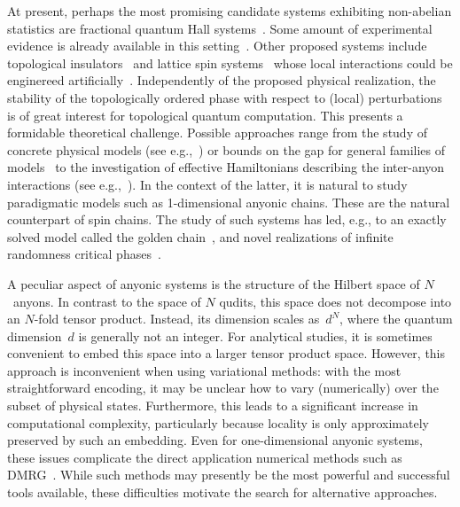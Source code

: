\documentclass[floats,prb,twocolumn]{revtex4}
\begin{document}
At present, perhaps the most promising candidate systems exhibiting non-abelian statistics are fractional quantum Hall systems~\cite{MooreRead,readrezayia,readrezayib}. Some amount of experimental evidence is already available in this setting~\cite{dolevetal,raduetal,willettetal}. Other proposed systems include topological insulators~\cite{FuKane05,MooreBalents07,LiangKaneMele07,Roy09} and lattice spin systems~\cite{Kitaev03,KitaevAnyons,LevinWen} whose local interactions could be enginereed artificially~\cite{duanetal03,michelietal06}. Independently of the proposed physical realization, 
 the stability of the topologically ordered phase with respect to (local) perturbations is of great  interest for topological quantum computation. This presents a formidable theoretical challenge. Possible approaches range from the study of concrete physical models (see e.g.,~\cite{trebstetal07,Tupitsynetal08,JVidal09,JVidal09b}) or bounds on the gap for general families of models~\cite{klich09,bravyihastingsmichalakis10,bravyihastings10} to the investigation of effective Hamiltonians describing the inter-anyon interactions (see e.g.,~\cite{bonderson09}). In the context of the latter, it is natural to study paradigmatic models such as 1-dimensional anyonic chains. These are the natural counterpart of  spin chains. The study of such systems has led, e.g., to an exactly solved model called the golden chain~\cite{Feiguinetal07}, and novel realizations of  infinite randomness critical phases~\cite{BonesteelYang07,Fidkowskietalrandom,Fidkowskietal08b}. 


A peculiar aspect of anyonic systems is the structure of the Hilbert space of $N$~anyons. In contrast to the space of $N$ qudits, this space does not decompose into an $N$-fold tensor product. Instead, its dimension scales as~$d^N$, where the quantum dimension~$d$ is generally not an integer. For analytical studies, it is sometimes convenient to embed this space into a larger tensor product space. However, this approach is inconvenient when using variational methods:  with the most straightforward encoding, it may be unclear how to vary (numerically) over the subset of physical states. Furthermore, this leads to a significant increase in computational complexity, particularly because locality is only approximately preserved by such an embedding. Even for one-dimensional anyonic systems, these issues complicate  the direct application numerical methods such as DMRG~\cite{white92}. While such methods may presently be the most powerful and successful tools available, these difficulties  motivate the search for alternative approaches. 
\end{document}
